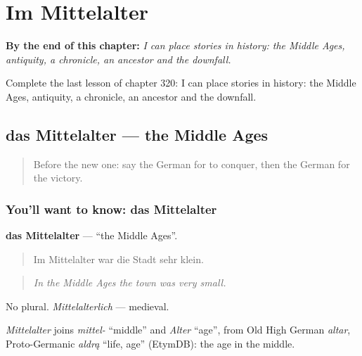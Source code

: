 
\chapter{Im Mittelalter}
\label{ch:ge-im-mittelalter}

\begin{chapteropening}
\textbf{By the end of this chapter:} \emph{I can place stories in history: the Middle Ages, antiquity, a chronicle, an ancestor and the downfall.}

Complete the last lesson of chapter 320: I can place stories in history: the Middle Ages, antiquity, a chronicle, an ancestor and the downfall.
\end{chapteropening}

\section[das Mittelalter]{das Mittelalter — the Middle Ages}

\label{lesson:GE-C320-mittelalter}



\begin{quote}
Before the new one: say the German for to conquer, then the German for the victory.
\end{quote}

\subsection*{You'll want to know: das Mittelalter}
\textbf{das Mittelalter} — \textquotedblleft{}the Middle Ages\textquotedblright{}.

\begin{quote}
Im Mittelalter war die Stadt sehr klein.
\end{quote}

\begin{quote}
\emph{In the Middle Ages the town was very small.}
\end{quote}

No plural. \emph{Mittelalterlich} — medieval.

\begin{cousinweb}
\emph{Mittelalter} joins \emph{mittel-} \textquotedblleft{}middle\textquotedblright{} and \emph{Alter} \textquotedblleft{}age\textquotedblright{}, from Old High German \emph{altar}, Proto-Germanic \emph{aldrą} \textquotedblleft{}life, age\textquotedblright{} (EtymDB): the age in the middle.
\end{cousinweb}

